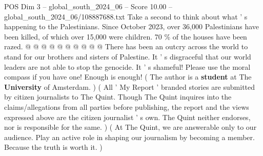 \begin{textsample}{POS Dim 3 – global\_south\_2024\_06 – Score 10.00 – global\_south\_2024\_06/108887688.txt}
Take a second to think about what ' s happening to the Palestinians.
Since October 2023, over 36,000 Palestinians have been killed, of which over 15,000 were children. 70 \% of the houses have been razed. @ @ @ @ @ @ @ @ @ @ There has been an outcry across the world to stand for our brothers and sisters of Palestine.
It ' s disgraceful that our world leaders are not able to stop the genocide.
It ' s shameful!
Please use the moral compass if you have one!
Enough is enough! ( The author is a \textbf{student} at The \textbf{University} of Amsterdam. ) ( All ' My Report ' branded stories are submitted by citizen journalists to The Quint.
Though The Quint inquires into the claims/allegations from all parties before publishing, the report and the views expressed above are the citizen journalist ' s own.
The Quint neither endorses, nor is responsible for the same. ) ( At The Quint, we are answerable only to our audience.
Play an active role in shaping our journalism by becoming a member.
Because the truth is worth it. )

\end{textsample}
